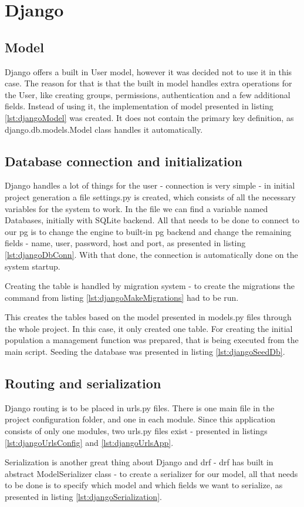 %
%
\section{Django}
\subsection{Model}\label{sub:djangoModel}
Django offers a built in User model, however it was decided not to use it in this case. The reason for that is that the built in model handles extra operations for the User, like creating groups, permissions, authentication and a few additional fields. Instead of using it, the implementation of model presented in listing \ref{lst:djangoModel} was created. It does not contain the primary key definition, as django.db.models.Model class handles it automatically.


\subsection{Database connection and initialization}
Django handles a lot of things for the user - connection is very simple - in initial project generation a file settings.py is created, which consists of all the necessary variables for the system to work. In the file we can find a variable named Databases, initially with SQLite backend. All that needs to be done to connect to our \acrlong{pg} is to change the engine to built-in \acrshort{pg} backend and change the remaining fields - name, user, password, host and port, as presented in listing \ref{lst:djangoDbConn}. With that done, the connection is automatically done on the system startup.

Creating the table is handled by migration system - to create the migrations the command from listing \ref{lst:djangoMakeMigrations} had to be run.

This creates the tables based on the model presented in models.py files through the whole project. In this case, it only created one table.
For creating the initial population a management function was prepared, that is being executed from the main script. Seeding the database was presented in listing \ref{lst:djangoSeedDb}.


\subsection{Routing and serialization}
Django routing is to be placed in urls.py files. There is one main file in the project configuration folder, and one in each module. Since this application consists of only one modules, two urls.py files exist - presented in listings \ref{lst:djangoUrlsConfig} and \ref{lst:djangoUrlsApp}.


Serialization is another great thing about Django and \acrlong{drf} - \acrshort{drf} has built in abstract ModelSerializer class - to create a serializer for our model, all that needs to be done is to specify which model and which fields we want to serialize, as presented in listing \ref{lst:djangoSerialization}.


